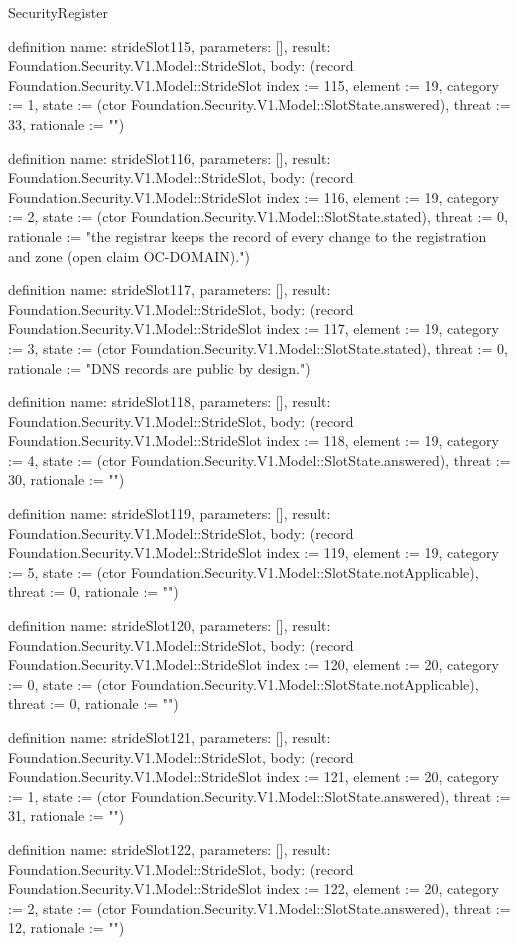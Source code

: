 \begin{lexlean}{SecurityRegister}
\begin{semanticmodule}
definition{
  name: strideSlot115,
  parameters: [],
  result: Foundation.Security.V1.Model::StrideSlot,
  body: (record Foundation.Security.V1.Model::StrideSlot {index := 115, element := 19, category := 1, state := (ctor Foundation.Security.V1.Model::SlotState.answered), threat := 33, rationale := ""})
}

definition{
  name: strideSlot116,
  parameters: [],
  result: Foundation.Security.V1.Model::StrideSlot,
  body: (record Foundation.Security.V1.Model::StrideSlot {index := 116, element := 19, category := 2, state := (ctor Foundation.Security.V1.Model::SlotState.stated), threat := 0, rationale := "the registrar keeps the record of every change to the registration and zone (open claim OC-DOMAIN)."})
}

definition{
  name: strideSlot117,
  parameters: [],
  result: Foundation.Security.V1.Model::StrideSlot,
  body: (record Foundation.Security.V1.Model::StrideSlot {index := 117, element := 19, category := 3, state := (ctor Foundation.Security.V1.Model::SlotState.stated), threat := 0, rationale := "DNS records are public by design."})
}

definition{
  name: strideSlot118,
  parameters: [],
  result: Foundation.Security.V1.Model::StrideSlot,
  body: (record Foundation.Security.V1.Model::StrideSlot {index := 118, element := 19, category := 4, state := (ctor Foundation.Security.V1.Model::SlotState.answered), threat := 30, rationale := ""})
}

definition{
  name: strideSlot119,
  parameters: [],
  result: Foundation.Security.V1.Model::StrideSlot,
  body: (record Foundation.Security.V1.Model::StrideSlot {index := 119, element := 19, category := 5, state := (ctor Foundation.Security.V1.Model::SlotState.notApplicable), threat := 0, rationale := ""})
}

definition{
  name: strideSlot120,
  parameters: [],
  result: Foundation.Security.V1.Model::StrideSlot,
  body: (record Foundation.Security.V1.Model::StrideSlot {index := 120, element := 20, category := 0, state := (ctor Foundation.Security.V1.Model::SlotState.notApplicable), threat := 0, rationale := ""})
}

definition{
  name: strideSlot121,
  parameters: [],
  result: Foundation.Security.V1.Model::StrideSlot,
  body: (record Foundation.Security.V1.Model::StrideSlot {index := 121, element := 20, category := 1, state := (ctor Foundation.Security.V1.Model::SlotState.answered), threat := 31, rationale := ""})
}

definition{
  name: strideSlot122,
  parameters: [],
  result: Foundation.Security.V1.Model::StrideSlot,
  body: (record Foundation.Security.V1.Model::StrideSlot {index := 122, element := 20, category := 2, state := (ctor Foundation.Security.V1.Model::SlotState.answered), threat := 12, rationale := ""})
}


\end{semanticmodule}
\end{lexlean}
